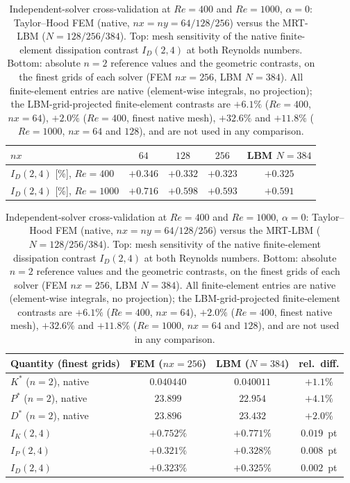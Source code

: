 \begin{table}[!htbp]
\centering
\caption{Independent-solver cross-validation at $Re=400$ and $Re=1000$, $\alpha=0$: Taylor--Hood FEM (native, $nx=ny=64/128/256$) versus the MRT-LBM ($N=128/256/384$). Top: mesh sensitivity of the native finite-element dissipation contrast $I_D(2,4)$ at both Reynolds numbers. Bottom: absolute $n=2$ reference values and the geometric contrasts, on the finest grids of each solver (FEM $nx=256$, LBM $N=384$). All finite-element entries are native (element-wise integrals, no projection); the LBM-grid-projected finite-element contrasts are $+6.1\%$ ($Re=400$, $nx=64$), $+2.0\%$ ($Re=400$, finest native mesh), $+32.6\%$ and $+11.8\%$ ($Re=1000$, $nx=64$ and $128$), and are not used in any comparison.}
\label{supptab:crosscheck}
\begin{tabular}{@{}lcccc@{}}
\hline
$nx$ & $64$ & $128$ & $256$ & LBM $N=384$ \\
\hline
$I_D(2,4)$ [\%], $Re=400$  & $+0.346$ & $+0.332$ & $+0.323$ & $+0.325$ \\
$I_D(2,4)$ [\%], $Re=1000$ & $+0.716$ & $+0.598$ & $+0.593$ & $+0.591$ \\
\hline
\end{tabular}

\vspace{4pt}

\begin{tabular}{@{}lccc@{}}
\hline
Quantity (finest grids) & FEM ($nx=256$) & LBM ($N=384$) & rel.\ diff. \\
\hline
$K^*$ ($n=2$), native   & $0.040440$ & $0.040011$ & $+1.1\%$ \\
$P^*$ ($n=2$), native   & $23.899$   & $22.954$   & $+4.1\%$ \\
$D^*$ ($n=2$), native   & $23.896$   & $23.432$   & $+2.0\%$ \\
\hline
$I_K(2,4)$              & $+0.752\%$ & $+0.771\%$ & $0.019$~pt \\
$I_P(2,4)$              & $+0.321\%$ & $+0.328\%$ & $0.008$~pt \\
$I_D(2,4)$              & $+0.323\%$ & $+0.325\%$ & $0.002$~pt \\
\hline
\end{tabular}
\end{table}

